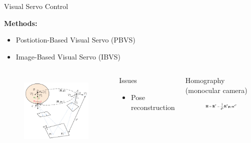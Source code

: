 \documentclass{beamer}
\begin{document}
\begin{frame}{Visual Servo Control}



\textbf{Methods:}
  \begin{itemize}
  \item
    Postiotion-Based Visual Servo (PBVS) 
  \item
    Image-Based Visual Servo (IBVS)
  \end{itemize}


\begin{columns}[t]
	\begin{figure}[ht!]
		\includegraphics[width=55mm]{Images/Notation.png}	
		\label{Notation}	
	\end{figure}	
	
	\begin{exampleblock}{Issues}		
		\begin{itemize}
			\item Pose reconstruction 
		\end{itemize}
	\end{exampleblock}
	
	\begin{exampleblock}{Homography \\(monocular camera)}
	\begin{figure}[ht!]	
		\includegraphics[width=40mm]{Images/Homography.png}		
		\label{Homography}	
	\end{figure}
	\end{exampleblock}
\end{columns}

\end{frame}
\end{document}
